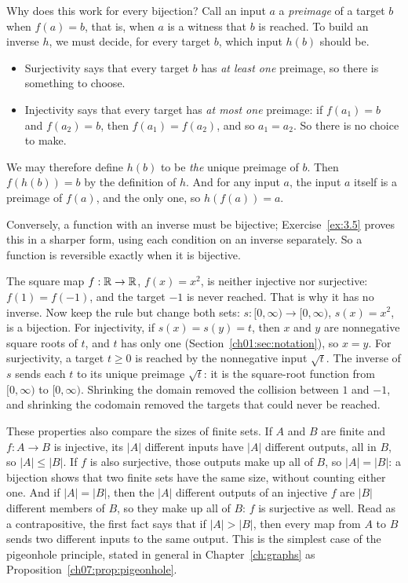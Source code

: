 Why does this work for every bijection? Call an input $a$ a \emph{preimage} of a target $b$ when $f(a)=b$, that is, when $a$ is a witness that $b$ is reached. To build an inverse $h$, we must decide, for every target $b$, which input $h(b)$ should be.
\begin{itemize}
\item Surjectivity says that every target $b$ has \emph{at least one} preimage, so there is something to choose.
\item Injectivity says that every target has \emph{at most one} preimage: if $f(a_1)=b$ and $f(a_2)=b$, then $f(a_1)=f(a_2)$, and so $a_1=a_2$. So there is no choice to make.
\end{itemize}
We may therefore define $h(b)$ to be \emph{the} unique preimage of $b$. Then $f(h(b))=b$ by the definition of $h$. And for any input $a$, the input $a$ itself is a preimage of $f(a)$, and the only one, so $h(f(a))=a$.

Conversely, a function with an inverse must be bijective; Exercise~\ref{ex:3.5} proves this in a sharper form, using each condition on an inverse separately. So a function is reversible exactly when it is bijective.

The square map $f:\mathbb R\to\mathbb R$, $f(x)=x^2$, is neither injective nor surjective: $f(1)=f(-1)$, and the target $-1$ is never reached. That is why it has no inverse. Now keep the rule but change both sets: $s:[0,\infty)\to[0,\infty)$, $s(x)=x^2$, is a bijection. For injectivity, if $s(x)=s(y)=t$, then $x$ and $y$ are nonnegative square roots of $t$, and $t$ has only one (Section~\ref{ch01:sec:notation}), so $x=y$. For surjectivity, a target $t\ge0$ is reached by the nonnegative input $\sqrt t$. The inverse of $s$ sends each $t$ to its unique preimage $\sqrt t$: it is the square-root function from $[0,\infty)$ to $[0,\infty)$. Shrinking the domain removed the collision between $1$ and $-1$, and shrinking the codomain removed the targets that could never be reached.

These properties also compare the sizes of finite sets. If $A$ and $B$ are finite and $f:A\to B$ is injective, its $|A|$ different inputs have $|A|$ different outputs, all in $B$, so $|A|\le|B|$. If $f$ is also surjective, those outputs make up all of $B$, so $|A|=|B|$: a bijection shows that two finite sets have the same size, without counting either one. And if $|A|=|B|$, then the $|A|$ different outputs of an injective $f$ are $|B|$ different members of $B$, so they make up all of $B$: $f$ is surjective as well. Read as a contrapositive, the first fact says that if $|A|>|B|$, then every map from $A$ to $B$ sends two different inputs to the same output. This is the simplest case of the pigeonhole principle, stated in general in Chapter~\ref{ch:graphs} as Proposition~\ref{ch07:prop:pigeonhole}.

